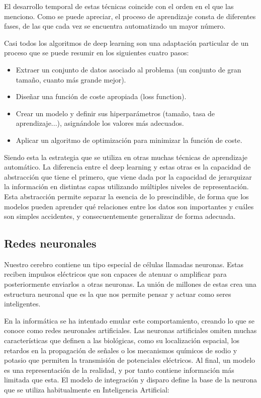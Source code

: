 El desarrollo temporal de estas técnicas coincide con el orden en el que las menciono. Como se puede apreciar, el proceso de aprendizaje consta de diferentes fases, de las que cada vez se encuentra automatizado un mayor número.

Casi todos los algoritmos de deep learning son una adaptación particular de un proceso que se puede resumir en los siguientes cuatro pasos:

\begin{itemize}
    \item Extraer un conjunto de datos asociado al problema (un conjunto de gran tamaño, cuanto más grande mejor).
    \item Diseñar una función de coste apropiada (loss function).
    \item Crear un modelo y definir sus hiperparámetros (tamaño, tasa de aprendizaje...), asignándole los valores más adecuados.
    \item Aplicar un algoritmo de optimización para minimizar la función de coste.
\end{itemize}

Siendo esta la estrategia que se utiliza en otras muchas técnicas de aprendizaje automático. La diferencia entre el deep learning y estas otras es la capacidad de abstracción que tiene el primero, que viene dada por la capacidad de jerarquizar la información en distintas capas utilizando múltiples niveles de representación. Esta abstracción permite separar la esencia de lo prescindible, de forma que los modelos pueden aprender qué relaciones entre los datos son importantes y cuáles son simples accidentes, y consecuentemente generalizar de forma adecuada.

\subsection*{Redes neuronales}
Nuestro cerebro contiene un tipo especial de células llamadas neuronas. Estas reciben impulsos eléctricos que son capaces de atenuar o amplificar para posteriormente enviarlos a otras neuronas. La unión de millones de estas crea una estructura neuronal que es la que nos permite pensar y actuar como seres inteligentes.

En la informática se ha intentado emular este comportamiento, creando lo que se conoce como redes neuronales artificiales. Las neuronas artificiales omiten muchas características que definen a las biológicas, como su localización espacial, los retardos en la propagación de señales o los mecanismos químicos de sodio y potasio que permiten la transmisión de potenciales eléctricos. Al final, un modelo es una representación de la realidad, y por tanto contiene información más limitada que esta. El modelo de integración y disparo define la base de la neurona que se utiliza habitualmente en Inteligencia Artificial:

